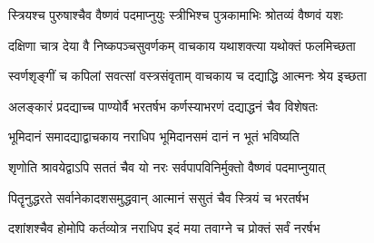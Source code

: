 \twolineshloka
{स्त्रियश्च पुरुषाश्चैव वैष्णवं पदमाप्नुयुः}
{स्त्रीभिश्च पुत्रकामाभिः श्रोतव्यं वैष्णवं यशः}


\twolineshloka
{दक्षिणा चात्र देया वै निष्कपञ्चसुवर्णकम्}
{वाचकाय यथाशक्त्या यथोक्तं फलमिच्छता}


\twolineshloka
{स्वर्णशृङ्गीं च कपिलां सवत्सां वस्त्रसंवृताम्}
{वाचकाय च दद्याद्धि आत्मनः श्रेय इच्छता}


\twolineshloka
{अलङ्कारं प्रदद्याच्च पाण्योर्वै भरतर्षभ}
{कर्णस्याभरणं दद्याद्धनं चैव विशेषतः}


\twolineshloka
{भूमिदानं समादद्याद्वाचकाय नराधिप}
{भूमिदानसमं दानं न भूतं भविष्यति}


\twolineshloka
{शृणोति श्रावयेद्वाऽपि सततं चैव यो नरः}
{सर्वपापविनिर्मुक्तो वैष्णवं पदमाप्नुयात्}


\twolineshloka
{पितॄनुद्धरते सर्वानेकादशसमुद्धवान्}
{आत्मानं ससुतं चैव स्त्रियं च भरतर्षभ}


\twolineshloka
{दशांशश्चैव होमोपि कर्तव्योत्र नराधिप}
{इदं मया तवाग्ने च प्रोक्तं सर्वं नरर्षभ}


